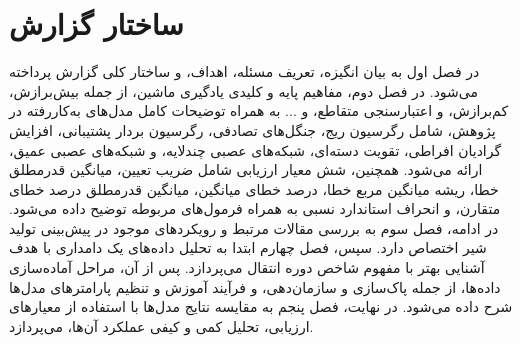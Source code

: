 \section{ساختار گزارش}

در فصل اول به بیان انگیزه، تعریف مسئله، اهداف، و ساختار کلی گزارش پرداخته می‌شود. در فصل دوم، مفاهیم پایه و کلیدی یادگیری ماشین، از جمله بیش‌برازش، کم‌برازش، و اعتبارسنجی متقاطع، و ...  به همراه توضیحات کامل مدل‌های به‌کاررفته در پژوهش، شامل رگرسیون ریج، جنگل‌های تصادفی، رگرسیون بردار پشتیبانی، افزایش گرادیان افراطی، تقویت دسته‌ای، شبکه‌های عصبی چندلایه، و شبکه‌های عصبی عمیق، ارائه می‌شود. همچنین، شش معیار ارزیابی شامل ضریب تعیین، میانگین قدرمطلق خطا، ریشه میانگین مربع خطا، درصد خطای میانگین، میانگین قدرمطلق درصد خطای متقارن، و انحراف استاندارد نسبی به همراه فرمول‌های مربوطه توضیح داده می‌شود. در ادامه، فصل سوم به بررسی مقالات مرتبط و رویکردهای موجود در پیش‌بینی تولید شیر اختصاص دارد. سپس، فصل چهارم ابتدا به تحلیل داده‌های یک دامداری با هدف آشنایی بهتر با مفهوم شاخص دوره انتقال می‌پردازد. پس از آن، مراحل آماده‌سازی داده‌ها، از جمله پاک‌سازی و سازمان‌دهی، و فرآیند آموزش و تنظیم پارامترهای مدل‌ها شرح داده می‌شود. در نهایت، فصل پنجم به مقایسه نتایج مدل‌ها با استفاده از معیارهای ارزیابی، تحلیل کمی و کیفی عملکرد آن‌ها، می‌پردازد.